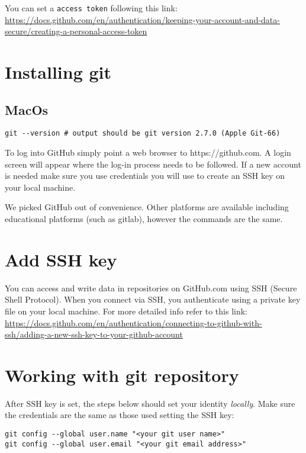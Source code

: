 \documentclass[11pt]{article}
\newcommand{\nextdiv}{\vspace{2mm}\noindent}
\begin{document}
You can set a \texttt{access token} following this link: \url{https://docs.github.com/en/authentication/keeping-your-account-and-data-secure/creating-a-personal-access-token}

\section*{Installing git}

\subsection*{MacOs}

\begin{lstlisting}
git --version # output should be git version 2.7.0 (Apple Git-66)
\end{lstlisting}

\nextdiv
To log into GitHub simply point a web browser to https://github.com. A login screen will appear where the log-in process needs to be followed. If a new account is needed make sure you use credentials you will use to create an SSH key on your local machine. 

\nextdiv
We picked GitHub out of convenience. Other platforms are available including educational platforms (such as gitlab), however the commands are the same.

\section*{Add SSH key}

You can access and write data in repositories on GitHub.com using SSH (Secure Shell Protocol). When you connect via SSH, you authenticate using a private key file on your local machine. For more detailed info refer to this link: \url{https://docs.github.com/en/authentication/connecting-to-github-with-ssh/adding-a-new-ssh-key-to-your-github-account}

\section*{Working with git repository}

After SSH key is set, the steps below should set your identity \textit{locally}. Make sure the credentials are the same as those used setting the SSH key:

\begin{lstlisting}
git config --global user.name "<your git user name>"
git config --global user.email "<your git email address>"
\end{lstlisting}
\end{document}
